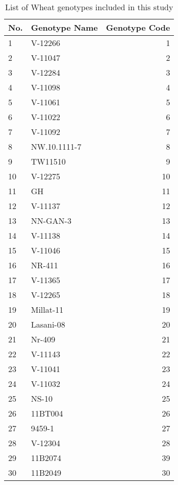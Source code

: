 \clearpage
\begin{table}[h!]
\centering
	\caption[List of genotypes]{List of Wheat genotypes included in this study }
	\begin{tabular}{ l l r} 
		\toprule
			No. & Genotype Name & Genotype Code \\
			\midrule  	
	1  &  V-12266              &  1 \\
	2  &  V-11047              &  2 \\
	3  &  V-12284              &  3 \\
	4  &  V-11098              &  4 \\
	5  &  V-11061              &  5 \\
	6  &  V-11022              &  6 \\
	7  &  V-11092              &  7  \\
	8  &  NW.10.1111-7         &  8  \\
	9  &  TW11510              &  9  \\
	10 &  V-12275              &  10  \\
	11 &  GH                   &  11 \\
	12 &  V-11137              &  12 \\
	13 &  NN-GAN-3             &  13 \\
	14 &  V-11138              &  14\\
	15 &  V-11046              &  15\\
	16 &  NR-411               &  16 \\
	17 &  V-11365              &  17\\
	18 &  V-12265              &  18\\
	19 &   Millat-11           &  19 \\
	20 &   Lasani-08           &  20\\
	21 &   Nr-409              &  21\\       
	22 &   V-11143             &   22\\
	23 &   V-11041             &   23\\
	24 &    V-11032            &   24\\
	25 &   NS-10               &   25\\
	26 &   11BT004             &   26\\
	27 &   9459-1              &   27\\
	28 &   V-12304             &   28\\
	29 &   11B2074             &   39\\
	30 &   11B2049             &   30\\
		\bottomrule
	\end{tabular}
	\label{Table:3.2 }
\end{table}

